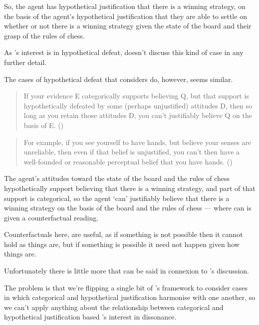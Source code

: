 \documentclass[10pt]{article}
\begin{document}
So, the agent has hypothetical justification that there is a winning strategy, on the basis of the agent's hypothetical justification that they are able to settle on whether or not there is a winning strategy given the state of the board and their grasp of the rules of chess.

As \citeauthor{Pryor:2018aa}'s interest is in hypothetical defeat, \citeauthor{Pryor:2018aa} doesn't discuss this kind of case in any further detail.

The cases of hypothetical defeat that \citeauthor{Pryor:2018aa} considers do, however, seems similar.

\begin{quote}
  If your evidence E categorically supports believing Q, but that support is hypothetically defeated by some (perhaps unjustified) attitudes D, then so long as you retain those attitudes D, you can't justifiably believe Q on the basis of E.\nolinebreak
  \mbox{}\hfill\mbox{(\citeauthor[129]{Pryor:2018aa})}
\end{quote}

\begin{quote}
  For example, if you see yourself to have hands, but believe your senses are unreliable, then even if that belief is unjustiﬁed, you can't then have a well-founded or reasonable perceptual belief that you have hands.\nolinebreak
  \mbox{}\hfill\mbox{(\citeauthor[129]{Pryor:2018aa})}
\end{quote}

The agent's attitudes toward the state of the board and the rules of chess hypothetically support believing that there is a winning strategy, and part of that support is categorical, so the agent `can' justifiably believe that there is a winning strategy on the basis of the board and the rules of chess --- where can is given a counterfactual reading.

Counterfactuals here, are useful, as if something is not possible then it cannot hold as things are, but if something is possible it need not happen given how things are.

Unfortunately there is little more that can be said in connexion to \citeauthor{Pryor:2018aa}'s discussion.

The problem is that we're flipping a single bit of \citeauthor{Pryor:2018aa}'s framework to consider cases in which categorical and hypothetical justification harmonise with one another, so we can't apply anything about the relationship between categorical and hypothetical justification based \citeauthor{Pryor:2018aa}'s interest in dissonance.
\end{document}

